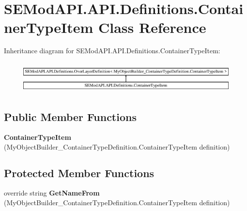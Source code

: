 \hypertarget{class_s_e_mod_a_p_i_1_1_a_p_i_1_1_definitions_1_1_container_type_item}{}\section{S\+E\+Mod\+A\+P\+I.\+A\+P\+I.\+Definitions.\+Container\+Type\+Item Class Reference}
\label{class_s_e_mod_a_p_i_1_1_a_p_i_1_1_definitions_1_1_container_type_item}
Inheritance diagram for S\+E\+Mod\+A\+P\+I.\+A\+P\+I.\+Definitions.\+Container\+Type\+Item\+:\begin{figure}[H]
\begin{center}
\leavevmode
\includegraphics[height=1.702128cm]{class_s_e_mod_a_p_i_1_1_a_p_i_1_1_definitions_1_1_container_type_item}
\end{center}
\end{figure}
\subsection*{Public Member Functions}
\begin{DoxyCompactItemize}
\item 
\hypertarget{class_s_e_mod_a_p_i_1_1_a_p_i_1_1_definitions_1_1_container_type_item_ae4b9f7a52dd152f82b1e4cdd0a9ceb3f}{}{\bfseries Container\+Type\+Item} (My\+Object\+Builder\+\_\+\+Container\+Type\+Definition.\+Container\+Type\+Item definition)\label{class_s_e_mod_a_p_i_1_1_a_p_i_1_1_definitions_1_1_container_type_item_ae4b9f7a52dd152f82b1e4cdd0a9ceb3f}

\end{DoxyCompactItemize}
\subsection*{Protected Member Functions}
\begin{DoxyCompactItemize}
\item 
\hypertarget{class_s_e_mod_a_p_i_1_1_a_p_i_1_1_definitions_1_1_container_type_item_abc88900181bf5bb3196e27c17cf284d1}{}override string {\bfseries Get\+Name\+From} (My\+Object\+Builder\+\_\+\+Container\+Type\+Definition.\+Container\+Type\+Item definition)\label{class_s_e_mod_a_p_i_1_1_a_p_i_1_1_definitions_1_1_container_type_item_abc88900181bf5bb3196e27c17cf284d1}

\end{DoxyCompactItemize}
